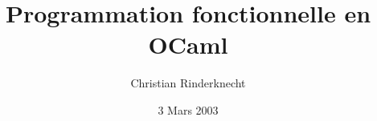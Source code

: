 \documentclass[compress,dvips,xcolor={dvipsnames},t]{beamer}
\title{Programmation fonctionnelle en OCaml}
\author{Christian Rinderknecht}
\date{3 Mars 2003}
\begin{document}
\frame{\maketitle}









\end{document}
